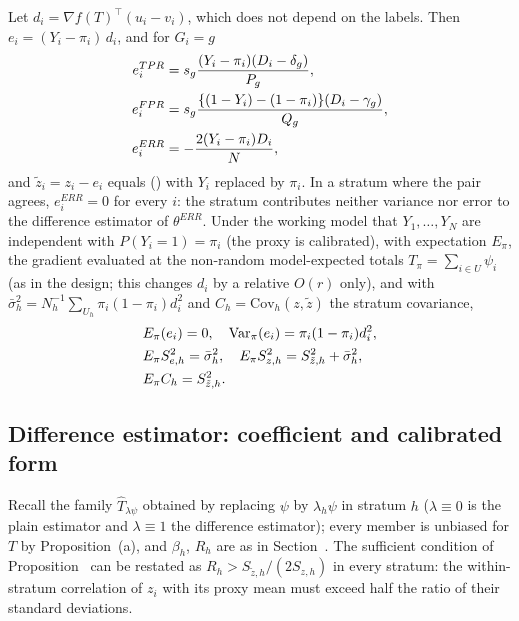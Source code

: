 \begin{proposition}\label{prop:residual}
Let $d_i=\nabla f(T)^\top(u_i-v_i)$, which does not depend on the labels. Then $e_i=(Y_i-\pi_i)\,d_i$, and for $G_i=g$
\begin{align}
e^{TPR}_i&=s_g\frac{(Y_i-\pi_i)(D_i-\delta_g)}{P_g},\notag\\
e^{FPR}_i&=s_g\frac{\{(1-Y_i)-(1-\pi_i)\}(D_i-\gamma_g)}{Q_g},\notag\\
e^{ERR}_i&=-\frac{2(Y_i-\pi_i)D_i}{N},\label{eq:resid-forms}
\end{align}
and $\tilde z_i=z_i-e_i$ equals () with $Y_i$ replaced by $\pi_i$. In a stratum where the pair agrees,
$e^{ERR}_i=0$ for every $i$: the stratum contributes neither variance nor error to the difference estimator of $\theta^{ERR}$.
Under the working model that $Y_1,\dots,Y_N$ are independent with $P(Y_i=1)=\pi_i$ (the proxy is calibrated), with expectation $E_\pi$,
the gradient evaluated at the non-random model-expected totals $T_\pi=\sum_{i\in U}\psi_i$ (as in the design; this changes $d_i$ by a relative $O(r)$ only),
and with $\bar\sigma^2_h=N_h^{-1}\sum_{U_h}\pi_i(1-\pi_i)d_i^2$ and $C_h=\mathrm{Cov}_h(z,\tilde z)$ the stratum covariance,
\begin{align}
&E_\pi(e_i)=0,\quad \mathrm{Var}_\pi(e_i)=\pi_i(1-\pi_i)d_i^2,\notag\\
&E_\pi S^2_{e,h}=\bar\sigma^2_h,\quad E_\pi S^2_{z,h}=S^2_{\tilde z,h}+\bar\sigma^2_h,\notag\\
&E_\pi C_h=S^2_{\tilde z,h}.\label{eq:resid-moments}
\end{align}
\end{proposition}

\subsection{Difference estimator: coefficient and calibrated form}\label{si:theory-dif}

Recall the family $\hat T_{\lambda\psi}$ obtained by replacing $\psi$ by $\lambda_h\psi$ in stratum $h$ ($\lambda\equiv0$ is the plain estimator and $\lambda\equiv1$
the difference estimator); every member is unbiased for $T$ by Proposition~(a), and $\beta_h$, $R_h$ are as in Section~.
The sufficient condition of Proposition~ can be restated as $R_h>S_{\tilde z,h}/(2S_{z,h})$ in every stratum: the within-stratum correlation of $z_i$ with its proxy mean must exceed half the ratio of their standard deviations.

